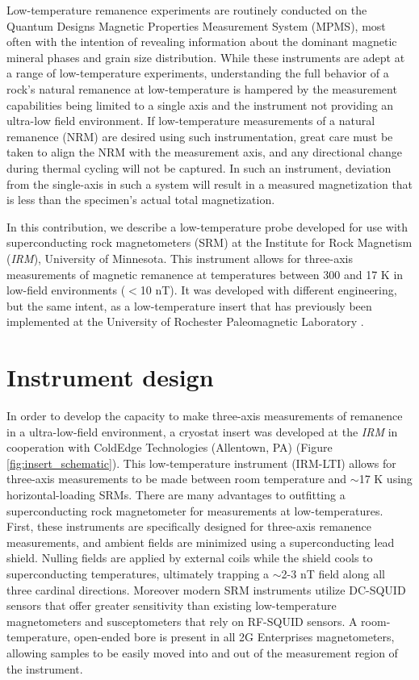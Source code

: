 \documentclass[draft,gc]{AGUTeX}
\begin{document}
\begin{article}
Low-temperature remanence experiments are routinely conducted on the Quantum Designs Magnetic Properties Measurement System (MPMS), most often with the intention of revealing information about the dominant magnetic mineral phases and grain size distribution. While these instruments are adept at a range of low-temperature experiments, understanding the full behavior of a rock's natural remanence at low-temperature is hampered by the measurement capabilities being limited to a single axis and the instrument not providing an ultra-low field environment. If low-temperature measurements of a natural remanence (NRM) are desired using such instrumentation, great care must be taken to align the NRM with the measurement axis, and any directional change during thermal cycling will not be captured. In such an instrument, deviation from the single-axis in such a system will result in a measured magnetization that is less than the specimen's actual total magnetization.

In this contribution, we describe a low-temperature probe developed for use with superconducting rock magnetometers (SRM) at the Institute for Rock Magnetism (\textit{IRM}), University of Minnesota. This instrument allows for three-axis measurements of magnetic remanence at temperatures between 300 and 17 K in low-field environments ($<$10 nT). It was developed with different engineering, but the same intent, as a low-temperature insert that has previously been implemented at the University of Rochester Paleomagnetic Laboratory \citep{Smirnov2011a}.

\section{Instrument design}

In order to develop the capacity to make three-axis measurements of remanence in a ultra-low-field environment, a cryostat insert was developed at the \textit{IRM} in cooperation with ColdEdge Technologies (Allentown, PA) (Figure \ref{fig:insert_schematic}). This low-temperature instrument (IRM-LTI) allows for three-axis measurements to be made between room temperature and $\sim$17 K using horizontal-loading SRMs. There are many advantages to outfitting a superconducting rock magnetometer for measurements at low-temperatures. First, these instruments are specifically designed for three-axis remanence measurements, and ambient fields are minimized using a superconducting lead shield. Nulling fields are applied by external coils while the shield cools to superconducting temperatures, ultimately trapping a $\sim$2-3 nT field along all three cardinal directions. Moreover modern SRM instruments utilize DC-SQUID sensors that offer greater sensitivity than existing low-temperature magnetometers and susceptometers that rely on RF-SQUID sensors. A room-temperature, open-ended bore is present in all 2G Enterprises magnetometers, allowing samples to be easily moved into and out of the measurement region of the instrument. 


\end{article}
\end{document}
